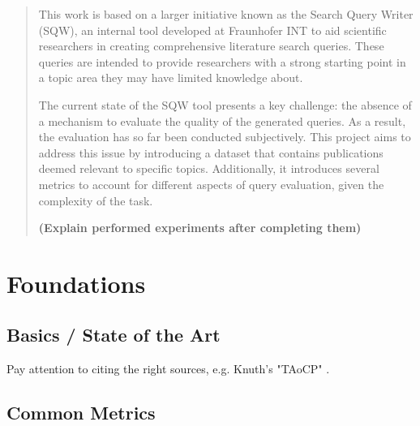 \documentclass[%
  a4paper,fontsize=11pt,abstract=on,%
  twoside,BCOR=19mm,%
]{scrreprt}
\begin{document}



\begin{abstract}
This work is based on a larger initiative known as the Search Query Writer (SQW), an internal tool developed at Fraunhofer INT to aid scientific researchers in creating comprehensive literature search queries. These queries are intended to provide researchers with a strong starting point in a topic area they may have limited knowledge about. 

The current state of the SQW tool presents a key challenge: the absence of a mechanism to evaluate the quality of the generated queries. As a result, the evaluation has so far been conducted subjectively. This project aims to address this issue by introducing a dataset that contains publications deemed relevant to specific topics. Additionally, it introduces several metrics to account for different aspects of query evaluation, given the complexity of the task.

\textbf{(Explain performed experiments after completing them)}



\end{abstract}

\cleardoublepage
\tableofcontents

\cleardoublepage
\setcounter{page}{1}








\chapter{Foundations}\label{ch:foundations}
\lipsum[1]

\section{Basics / State of the Art}\label{sec:basics}
Pay attention to citing the right sources, e.g. Knuth's "TAoCP" \cite{DBLP:books/lib/Knuth97}.

\lipsum[1-3]


\section{Common Metrics}\label{sec:metrics}
\lipsum[1-3]
\end{document}
